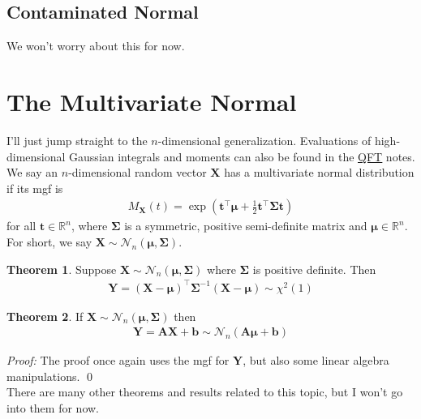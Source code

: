 \documentclass{book}
\theoremstyle{definition}
\newtheorem{thm}{Theorem}[section]
\newcommand{\R}{\mathbb{R}}
\newcommand{\X}{\mathbf{X}}
\newcommand{\f}[2]{\frac{#1}{#2}}
\newcommand{\lp}{\left(}
\newcommand{\rp}{\right)}
\newcommand{\Y}{\mathbf{Y}}
\begin{document}
\subsection{Contaminated Normal}

We won't worry about this for now.


\section{The Multivariate Normal}
I'll just jump straight to the $n$-dimensional generalization. Evaluations of high-dimensional Gaussian integrals and moments can also be found in the \href{https://huanqbui.com/LaTeX projects/HuanBui_QM/HuanBui_QM.pdf}{\underline{QFT}} notes. \\

We say an $n$-dimensional random vector $\X$ has a multivariate normal distribution if its mgf is 
\begin{align}
\boxed{M_{\X}(t) = \exp\lp \mathbf{t}^\top\bm{\mu} + \f{1}{2}\mathbf{t}^\top\mathbf{\Sigma}\mathbf{t} \rp}
\end{align}
for all $\mathbf{t} \in \R^n$, where $\mathbf{\Sigma}$ is a symmetric, positive semi-definite matrix and $\bm{\mu} \in \R^n$. For short, we say $\X \sim \mathcal{N}_n(\bm{\mu}, \mathbf{\Sigma})$.   \\

\begin{thm} Suppose $\X \sim \mathcal{N}_n(\bm{\mu}, \mathbf{\Sigma})$ where $\mathbf{\Sigma}$ is positive definite. Then 
\begin{align}
\boxed{\Y = (\X - \bm{\mu})^\top \mathbf{\Sigma}^{-1}(\X - \bm{\mu}) \sim\chi^2(1)}
\end{align}
\end{thm}

\begin{thm} If $\X \sim \mathcal{N}_n(\bm{\mu},\mathbf{\Sigma})$ then
\begin{align}
\boxed{\Y = \mathbf{A}\X + \mathbf{b} \sim \mathcal{N}_n(\mathbf{A}\bm{\mu} + \mathbf{b})}
\end{align}
\end{thm}
\noindent \textit{Proof:} The proof once again uses the mgf for $\Y$, but also some linear algebra manipulations. \qed\\

There are many other theorems and results related to this topic, but I won't go into them for now. \\
\end{document}
